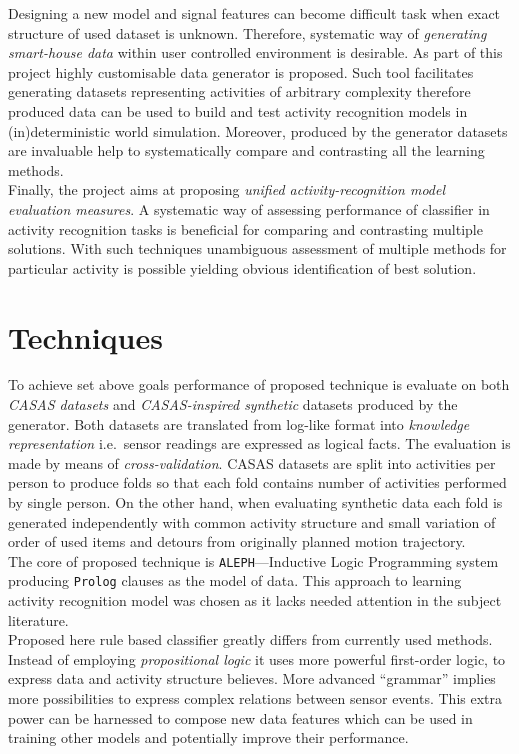 \documentclass[11pt, a4paper, pdflatex, leqno, twoside, openright]{report}
\begin{document}
Designing a new model and signal features can become difficult task when exact structure of used dataset is unknown. Therefore, systematic way of \emph{generating smart-house data} within user controlled environment is desirable. As part of this project highly customisable data generator is proposed. Such tool facilitates generating datasets representing activities of arbitrary complexity therefore produced data can be used to build and test activity recognition models in (in)deterministic world simulation. Moreover, produced by the generator datasets are invaluable help to systematically compare and contrasting all the learning methods.\\

Finally, the project aims at proposing \emph{unified activity-recognition model evaluation measures}. A systematic way of assessing performance of classifier in activity recognition tasks is beneficial for comparing and contrasting multiple solutions. With such techniques unambiguous assessment of multiple methods for particular activity is possible yielding obvious identification of best solution.

\section{Techniques}
To achieve set above goals performance of proposed technique is evaluate on both \emph{CASAS datasets} and \emph{CASAS-inspired synthetic} datasets produced by the generator. Both datasets are translated from log-like format into \emph{knowledge representation} i.e.\ sensor readings are expressed as logical facts. The evaluation is made by means of \emph{cross-validation}. CASAS datasets are split into activities per person to produce folds so that each fold contains number of activities performed by single person. On the other hand, when evaluating synthetic data each fold is generated independently with common activity structure and small variation of order of used items and detours from originally planned motion trajectory.\\

The core of proposed technique is \texttt{ALEPH}---Inductive Logic Programming system producing \texttt{Prolog} clauses as the model of data. This approach to learning activity recognition model was chosen as it lacks needed attention in the subject literature.\\

Proposed here rule based classifier greatly differs from currently used methods. Instead of employing \emph{propositional logic} it uses more powerful first-order logic, to express data and activity structure believes. More advanced ``grammar'' implies more possibilities to express complex relations between sensor events. This extra power can be harnessed to compose new data features which can be used in training other models and potentially improve their performance.\\
\end{document}
